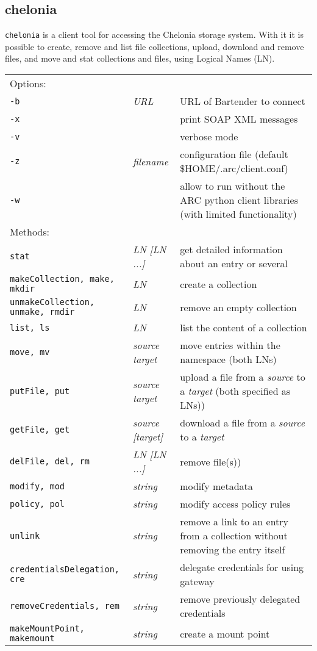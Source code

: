 \subsection{chelonia}\label{sec:chelonia}

\texttt{chelonia} is a client tool for
accessing the Chelonia storage system. With it it is possible to
create, remove and list file collections, upload, download and remove files,
and move and stat collections and files, using Logical Names (LN).
\hspace*{0.5cm}
\begin{shaded}
\end{shaded}
\begin{longtable}{llp{8cm}}
   Options:&&\\
   \texttt{-b} & \textit{URL} & URL of Bartender to connect\\
   \texttt{-x} && print SOAP XML messages\\
   \texttt{-v} && verbose mode\\
   \texttt{-z}&\textit{filename}& configuration file (default {\$}HOME/.arc/client.conf)\\
   \texttt{-w} && allow to run without the ARC python client libraries (with limited functionality)\\
   Methods:&&\\
   \texttt{stat} &\textit{LN [LN ...]}& get detailed information about an entry or several\\
   \texttt{makeCollection, make, mkdir} &\textit{LN}& create a collection\\
   \texttt{unmakeCollection, unmake, rmdir} &\textit{LN}& remove an empty collection\\
   \texttt{list, ls} &\textit{LN}& list the content of a collection\\
   \texttt{move, mv} &\textit{source target}& move entries within the namespace (both LNs)\\
   \texttt{putFile, put} &\textit{source target}& upload a file from a \textit{source} to a \textit{target} (both specified as LNs))\\
   \texttt{getFile, get} &\textit{source [target]}& download a file from a \textit{source} to a \textit{target}\\
   \texttt{delFile, del, rm} &\textit{LN [LN ...]}& remove file(s))\\
   \texttt{modify, mod} &\textit{string}& modify metadata\\
   \texttt{policy, pol} &\textit{string}& modify access policy rules\\
   \texttt{unlink} &\textit{string}& remove a link to an entry from a collection without removing the entry itself\\
   \texttt{credentialsDelegation, cre} &\textit{string}& delegate credentials for using gateway\\
   \texttt{removeCredentials, rem} &\textit{string}& remove previously delegated credentials\\
   \texttt{makeMountPoint, makemount} &\textit{string}& create a mount point\\
\end{longtable}
